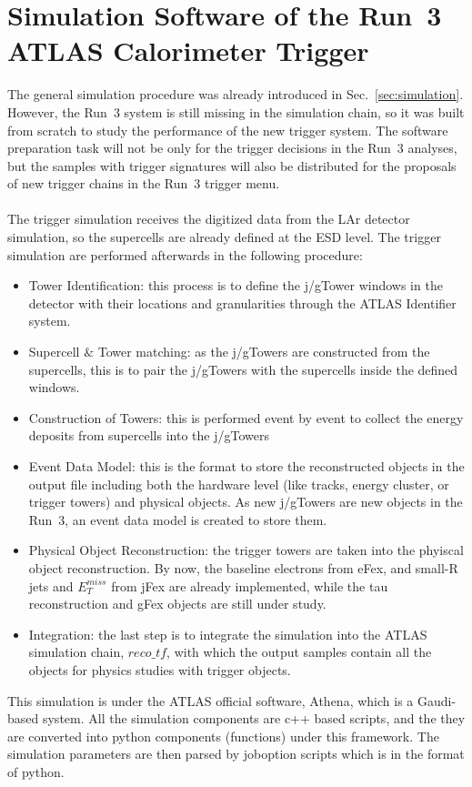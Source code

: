 \section{Simulation Software of the Run~3 ATLAS Calorimeter Trigger}
The general simulation procedure was already introduced in Sec.~\ref{sec:simulation}. However, the Run~3 system is still missing in the simulation chain, so it was built from scratch to study the performance of the new trigger system. The software preparation task will not be only for the trigger decisions in the Run~3 analyses, but the samples with trigger signatures will also be distributed for the proposals of new trigger chains in the Run~3 trigger menu. 
\\
\\The trigger simulation receives the digitized data from the LAr detector simulation, so the supercells are already defined at the ESD level. The trigger simulation are performed afterwards in the following procedure:
\begin{itemize}
	\item Tower Identification: this process is to define the j/gTower windows in the detector with their locations and granularities through the ATLAS Identifier system.
	\item Supercell $\&$ Tower matching: as the j/gTowers are constructed from the supercells, this is to pair the j/gTowers with the supercells inside the defined windows.
	\item Construction of Towers: this is performed event by event to collect the energy deposits from supercells into the j/gTowers
	\item Event Data Model: this is the format to store the reconstructed objects in the output file including both the hardware level (like tracks, energy cluster, or trigger towers) and physical objects. As new j/gTowers are new objects in the Run~3, an event data model is created to store them.
	\item Physical Object Reconstruction: the trigger towers are taken into the phyiscal object reconstruction. By now, the baseline electrons from eFex, and small-R jets and $E^{miss}_{T}$ from jFex are already implemented, while the tau reconstruction and gFex objects are still under study. 
	\item Integration: the last step is to integrate the simulation into the ATLAS simulation chain, $reco\_tf$, with which the output samples contain all the objects for physics studies with trigger objects. 
\end{itemize}
\noindent
This simulation is under the ATLAS official software, Athena, which is a Gaudi-based system\cite{Mato:2010zz}. All the simulation components are c++ based scripts, and the they are converted into python components (functions) under this framework. The simulation parameters are then parsed by joboption scripts which is in the format of python. 
